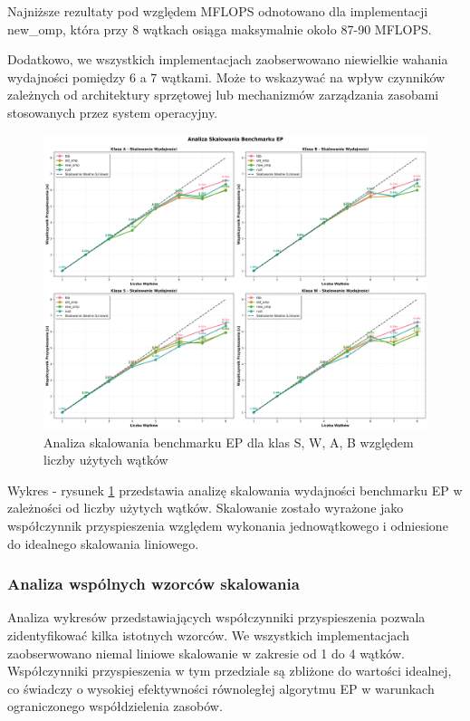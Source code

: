 Najniższe rezultaty pod względem MFLOPS odnotowano dla implementacji new\_omp, która przy 8 wątkach osiąga maksymalnie około 87-90 MFLOPS.

Dodatkowo, we wszystkich implementacjach zaobserwowano niewielkie wahania wydajności pomiędzy 6 a 7 wątkami. Może to wskazywać na wpływ czynników zależnych od architektury sprzętowej lub mechanizmów zarządzania zasobami stosowanych przez system operacyjny.

\begin{figure}[H]
    \centering
    \includegraphics[width=\textwidth]{analiza/images/parallel/ep/x86/ep_analiza_skalowania.png}
    \caption{Analiza skalowania benchmarku EP dla klas S, W, A, B względem liczby użytych wątków}
    \label{ep_analiza_skalowania_x86_64}
\end{figure}
Wykres - rysunek \ref{ep_analiza_skalowania_x86_64} przedstawia analizę skalowania wydajności benchmarku EP w zależności od liczby użytych wątków. Skalowanie zostało wyrażone jako współczynnik przyspieszenia względem wykonania jednowątkowego i odniesione do idealnego skalowania liniowego.

\subsubsection{Analiza wspólnych wzorców skalowania}
Analiza wykresów przedstawiających współczynniki przyspieszenia pozwala zidentyfikować kilka istotnych wzorców. We wszystkich implementacjach zaobserwowano niemal liniowe skalowanie w zakresie od 1 do 4 wątków. Współczynniki przyspieszenia w tym przedziale są zbliżone do wartości idealnej, co świadczy o wysokiej efektywności równoległej algorytmu EP w warunkach ograniczonego współdzielenia zasobów.

